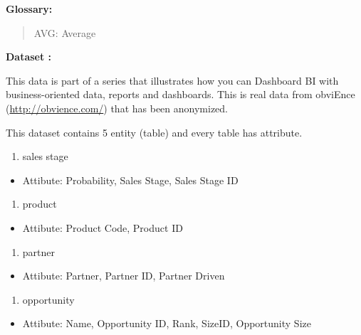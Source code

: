 \documentclass[]{book}
\providecommand{\tightlist}{%
  \setlength{\itemsep}{0pt}\setlength{\parskip}{0pt}}
\begin{document}
\textbf{Glossary: }

\begin{quote}
AVG: Average
\end{quote}

\textbf{Dataset : }

This data is part of a series that illustrates how you can Dashboard BI
with business-oriented data, reports and dashboards. This is real data
from obviEnce (\url{http://obvience.com/}) that has been anonymized.

This dataset contains 5 entity (table) and every table has attribute.

\begin{enumerate}
\def\labelenumi{\arabic{enumi}.}
\tightlist
\item
  sales stage
\end{enumerate}

\begin{itemize}
\tightlist
\item
  Attibute: Probability, Sales Stage, Sales Stage ID
\end{itemize}

\begin{enumerate}
\def\labelenumi{\arabic{enumi}.}
\setcounter{enumi}{1}
\tightlist
\item
  product
\end{enumerate}

\begin{itemize}
\tightlist
\item
  Attibute: Product Code, Product ID
\end{itemize}

\begin{enumerate}
\def\labelenumi{\arabic{enumi}.}
\setcounter{enumi}{2}
\tightlist
\item
  partner
\end{enumerate}

\begin{itemize}
\tightlist
\item
  Attibute: Partner, Partner ID, Partner Driven
\end{itemize}

\begin{enumerate}
\def\labelenumi{\arabic{enumi}.}
\setcounter{enumi}{3}
\tightlist
\item
  opportunity
\end{enumerate}

\begin{itemize}
\tightlist
\item
  Attibute: Name, Opportunity ID, Rank, SizeID, Opportunity Size
\end{itemize}
\end{document}
